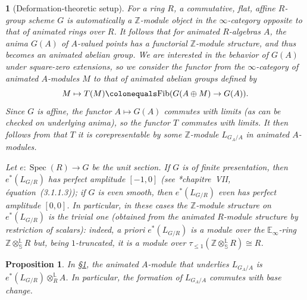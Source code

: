 \documentclass[11pt, reqno]{amsart}
\newcommand{\bE}{\mathbb{E}}
\newcommand{\bL}{\mathbb{L}}
\DeclareMathOperator{\Spec}{Spec}		%
\newcommand{\ce}{\colonequals}
\newcommand{\ra}{\rightarrow}
\providecommand{\uref}[1]{{\upshape\ref{#1}}}
\providecommand{\uS}{{\upshape\S}}
\numberwithin{equation}{numberingbase}
\theoremstyle{thms}
\newtheorem{proposition}[numberingbase]{Proposition}
\theoremstyle{claims}
\theoremstyle{defs}
\theoremstyle{thms}
\theoremstyle{defs}
\theoremstyle{subsection-tweak}
\newtheorem{pp}[numberingbase]{}
\newcommand{\bpp}{\begin{pp}}
\newcommand{\epp}{\end{pp}}
\theoremstyle{subsection-tweak}
\begin{document}
\bpp[Deformation-theoretic setup] \label{def-setup}
For a ring $R$, a commutative, flat, affine $R$-group scheme $G$ is automatically a $\mathbb Z$-module object in the $\infty$-category opposite to that of animated rings over $R$. %
It follows that for animated $R$-algebras $A$, the anima $G(A)$ of $A$-valued points has a functorial $\mathbb Z$-module structure, and thus becomes an animated abelian group. We are interested in the behavior of $G(A)$ under square-zero extensions, so we  consider the functor from the $\infty$-category of animated $A$-modules $M$ to that of animated abelian groups defined by
\[
M\mapsto T(M) \ce \mathrm{Fib}(G(A\oplus M)\to G(A)).
\]
Since $G$ is affine, the functor $A\mapsto G(A)$ commutes with %
 limits (as can be checked on underlying anima), so the functor $T$ commutes with %
 limits. %
 It %
 then  follows from \cite[Proposition 5.5.2.7]{HTT} that $T$ it is corepresentable by some $\mathbb Z$-module $L_{G_A/A}$ in animated $A$-modules.

Let $e \colon \Spec(R)\ra G$ be the unit section. If $G$ is of finite presentation, then $e^*(L_{G/R})$ has perfect amplitude $[-1, 0]$ (see \cite{Ill72}*{chapitre~VII, \'{e}quation~(3.1.1.3)}); if $G$ is even smooth, then $e^*(L_{G/R})$ even has perfect amplitude $[0, 0]$. In particular, in these cases the $\mathbb Z$-module structure on $e^*(L_{G/R})$ is the trivial one (obtained from the animated $R$-module structure by restriction of scalars): indeed, a priori $e^*(L_{G/R})$ is a module over the $\bE_\infty$-ring $\mathbb Z\otimes_{\mathbb S}^\bL R$ but, being $1$-truncated, it is a module over $\tau_{\leq 1}(\mathbb Z\otimes_{\mathbb S}^\bL R)\cong R$.
\epp

\begin{proposition} \label{L-underlie}
In \uS\uref{def-setup}, the animated $A$-module that underlies $L_{G_A/A}$ is $e^\ast(  L_{G/R})\otimes_R^{\mathbb L} A$. In particular, the formation of $L_{G_A/A}$ commutes with base change. %
\end{proposition}
\end{document}
